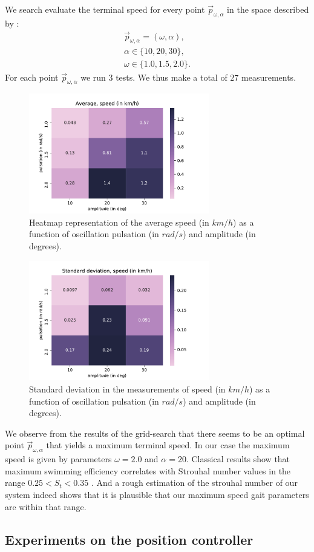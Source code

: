 \documentclass[11pt]{article}
\begin{document}
We search evaluate the terminal speed for every point $\vec{p}_{\omega,\alpha}$ in the space described by :
\begin{align*}
    \vec{p}_{\omega,\alpha} = (\omega, \alpha), \\
    \alpha \in \{ 10, 20, 30 \}, \\
    \omega \in \{ 1.0, 1.5, 2.0 \}. 
\end{align*}
For each point $\vec{p}_{\omega,\alpha}$ we run $3$ tests. We thus make a total of $27$ measurements. 

\begin{figure}
    \centering
    \includegraphics[width=0.7\textwidth]{figures/heatmap_speed.pdf}
    \caption{Heatmap representation of the average speed (in $km/h$) as a function of oscillation pulsation (in $rad/s$) and amplitude (in degrees).}
    \label{fig:heatmap_speed}
\end{figure}
\begin{figure}
    \centering
    \includegraphics[width=0.7\textwidth]{figures/heatmap_var.pdf}
    \caption{Standard deviation in the measurements of speed (in $km/h$) as a function of oscillation pulsation (in $rad/s$) and amplitude (in degrees).}
    \label{fig:heatmap_speed_std}
\end{figure}
We observe from the results of the grid-search that there seems to be an optimal point $\vec{p}_{\omega,\alpha}$ that yields a maximum terminal speed. In our case the maximum speed is given by parameters $\omega = 2.0$ and $\alpha = 20$. Classical results show that maximum swimming efficiency correlates with Strouhal number values in the range $0.25 < S_t < 0.35$ \cite{triantafyllou_91} \cite{triantafyllou_93}. And a rough estimation of the strouhal number of our system indeed shows that it is plausible that our maximum speed gait parameters are within that range.

\subsection{Experiments on the position controller}
\label{experiments_position}

\printbibliography %
\end{document}
